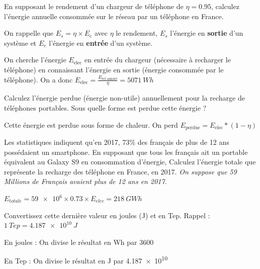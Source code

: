\documentclass[10pt,fleqn]{article} %
\begin{document}
\begin{exercise}
\begin{question}
  En supposant le rendement d'un chargeur de téléphone de $\eta = 0.95$, calculez l'énergie annuelle consommée sur le réseau par un téléphone en France.
  
  On rappelle que $E_s = \eta \times E_e$ avec $\eta$ le rendement, $E_s$ l'énergie en \textbf{sortie} d'un système et $E_e$ l'énergie en \textbf{entrée} d'un système. 
\end{question}
\begin{solution}
  On cherche l'énergie $E_{\text{elec}}$ en entrée du chargeur (nécessaire à recharger le téléphone) en connaissant l'énergie en sortie (énergie consommée par le téléphone). On a donc $ E_{\text{elec}} = \frac{E_{\text{tel annuel}}}{\eta} = \SI{5071}{Wh}$
\end{solution}

\begin{question}
Calculez l'énergie perdue (énergie non-utile) annuellement pour la recharge de téléphones portables. Sous quelle forme est perdue cette énergie ? 
\end{question}
\begin{solution}
  Cette énergie est perdue sous forme de chaleur. On perd $E_{\text{perdue}} = E_{\text{elec}} * (1-\eta) $
\end{solution}

\begin{question}
  Les statistiques indiquent qu'en 2017, 73\% des français de plus de 12 ans possédaient un smartphone. En supposant que tous les français ait un portable équivalent au Galaxy S9 en consommation d'énergie, Calculez l'énergie totale que représente la recharge des téléphone en France, en 2017. 
  \textit{On suppose que 59 Millions de Français avaient plus de 12 ans en 2017. }
\end{question}
\begin{solution}
  $E_{totale} = \num{59e6}\times 0.73 \times E_{elec}  = \SI{218}{GWh}$
\end{solution}

\begin{question}
Convertissez cette dernière valeur en joules (J) et en Tep. Rappel : $\SI{1}{Tep} = \SI{4.187e10}{J}$
\end{question}
\begin{solution}
  En joules : On divise le résultat en Wh par 3600
  
  En Tep : On divise le résultat en J par \num{4.187e10}
\end{solution}
\end{exercise}
\end{document}

